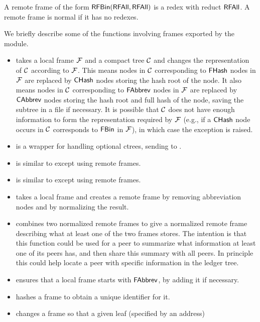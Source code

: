 A remote frame of the form ${\constr{RFBin}}({\constr{RFAll}},{\constr{RFAll}})$
is a redex with reduct ${\constr{RFAll}}$.
A remote frame is normal if it has no redexes.

We briefly describe some of the functions involving frames
exported by the {} module.
\begin{itemize}
\item {} takes a local frame $\mathcal{F}$ and a compact tree $\mathcal{C}$
and changes the representation of $\mathcal{C}$ according to $\mathcal{F}$.
This means nodes in $\mathcal{C}$ corresponding to ${\constr{FHash}}$ nodes in $\mathcal{F}$
are replaced by ${\constr{CHash}}$ nodes storing the hash root of the node.
It also means nodes in $\mathcal{C}$ corresponding to ${\constr{FAbbrev}}$ nodes in $\mathcal{F}$
are replaced by ${\constr{CAbbrev}}$ nodes storing the hash root and full hash of the node,
saving the subtree in a file if necessary.
It is possible that $\mathcal{C}$ does not have enough information to form the
representation required by $\mathcal{F}$ (e.g., if a ${\constr{CHash}}$ node occurs in $\mathcal{C}$ corresponds
to ${\constr{FBin}}$ in $\mathcal{F}$),
in which case the exception {} is raised.
\item {} is a wrapper for {} handling
optional ctrees, sending {} to {}.
\item {} is similar to {} except using remote frames.
\item {} is similar to {} except using remote frames.
\item {} takes a local frame and creates a remote frame
by removing abbreviation nodes and by normalizing the result.
\item {} combines two normalized remote
 frames to give a normalized remote frame
 describing what at least one of the two frames stores.
 The intention is that this function could be used for a peer to summarize
 what information at least one of its peers has, and then share this
 summary with all peers. In principle this could help locate a peer with specific
 information in the ledger tree.
\item {} ensures that a local frame starts with ${\constr{FAbbrev}}$, by adding it if necessary.
\item {} hashes a frame to obtain a unique identifier for it.
\item {} changes a frame so that a given leaf (specified by an address)

\end{itemize}
